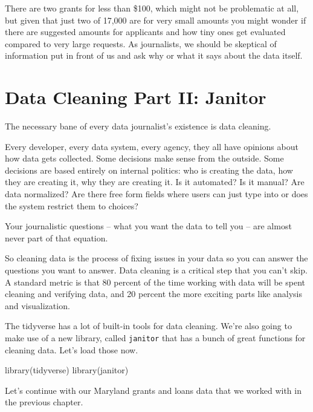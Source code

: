 \documentclass[
  letterpaper,
  DIV=11,
  numbers=noendperiod]{scrreprt}
\newenvironment{Shaded}{\begin{snugshade}}{\end{snugshade}}
\newcommand{\FunctionTok}[1]{\textcolor[rgb]{0.28,0.35,0.67}{#1}}
\newcommand{\NormalTok}[1]{\textcolor[rgb]{0.00,0.23,0.31}{#1}}
\begin{document}
There are two grants for less than \$100, which might not be problematic
at all, but given that just two of 17,000 are for very small amounts you
might wonder if there are suggested amounts for applicants and how tiny
ones get evaluated compared to very large requests. As journalists, we
should be skeptical of information put in front of us and ask why or
what it says about the data itself.


\hypertarget{data-cleaning-part-ii-janitor}{%
\chapter{Data Cleaning Part II:
Janitor}\label{data-cleaning-part-ii-janitor}}

The necessary bane of every data journalist's existence is data
cleaning.

Every developer, every data system, every agency, they all have opinions
about how data gets collected. Some decisions make sense from the
outside. Some decisions are based entirely on internal politics: who is
creating the data, how they are creating it, why they are creating it.
Is it automated? Is it manual? Are data normalized? Are there free form
fields where users can just type into or does the system restrict them
to choices?

Your journalistic questions -- what you want the data to tell you -- are
almost never part of that equation.

So cleaning data is the process of fixing issues in your data so you can
answer the questions you want to answer. Data cleaning is a critical
step that you can't skip. A standard metric is that 80 percent of the
time working with data will be spent cleaning and verifying data, and 20
percent the more exciting parts like analysis and visualization.

The tidyverse has a lot of built-in tools for data cleaning. We're also
going to make use of a new library, called \texttt{janitor} that has a
bunch of great functions for cleaning data. Let's load those now.

\begin{Shaded}
\begin{Highlighting}[]
\FunctionTok{library}\NormalTok{(tidyverse)}
\FunctionTok{library}\NormalTok{(janitor)}
\end{Highlighting}
\end{Shaded}

Let's continue with our Maryland grants and loans data that we worked
with in the previous chapter.
\end{document}

